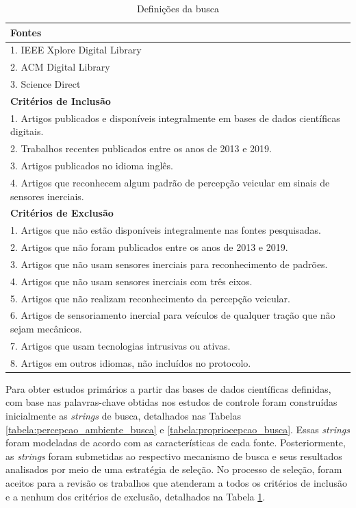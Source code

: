 \begin{table}[h!]
    \small
    \centering
    \caption{Definições da busca}
    \label{tabela:definicao_pesquisa}
    \begin{tabular}{l}
        \toprule
        \textbf{Fontes} \\
        \toprule
        1. IEEE Xplore Digital Library \\
        2. ACM Digital Library \\
        3. Science Direct \\
        \toprule
        \textbf{Critérios de Inclusão}\\
        \toprule
        1. Artigos publicados e disponíveis integralmente em bases de dados científicas digitais.\\
        2. Trabalhos recentes publicados entre os anos de 2013 e 2019.\\ 
        3. Artigos publicados no idioma inglês.\\
        4. Artigos que reconhecem algum padrão de percepção veicular em sinais de sensores inerciais.\\
        \toprule
        \textbf{Critérios de Exclusão}\\
        \toprule
        1. Artigos que não estão disponíveis integralmente nas fontes pesquisadas.\\
        2. Artigos que não foram publicados entre os anos de 2013 e 2019.\\
        3. Artigos que não usam sensores inerciais para reconhecimento de padrões.\\
        4. Artigos que não usam sensores inerciais com três eixos.\\
        5. Artigos que não realizam reconhecimento da percepção veicular. \\
        6. Artigos de sensoriamento inercial para veículos de qualquer tração que não sejam mecânicos. \\
        7. Artigos que usam tecnologias intrusivas ou ativas.\\
        8. Artigos em outros idiomas, não incluídos no protocolo.\\
        \bottomrule
    \end{tabular}
\end{table}

Para obter estudos primários a partir das bases de dados científicas definidas, com base nas palavras-chave obtidas nos estudos de controle foram construídas inicialmente as \textit{strings} de busca, detalhados nas Tabelas \ref{tabela:percepcao_ambiente_busca} e \ref{tabela:propriocepcao_busca}. Essas \textit{strings} foram modeladas de acordo com as características de cada fonte. Posteriormente, as \textit{strings} foram submetidas ao respectivo mecanismo de busca e seus resultados analisados por meio de uma estratégia de seleção. No processo de seleção, foram aceitos para a revisão os trabalhos que atenderam a todos os critérios de inclusão e a nenhum dos critérios de exclusão, detalhados na Tabela \ref{tabela:definicao_pesquisa}.

